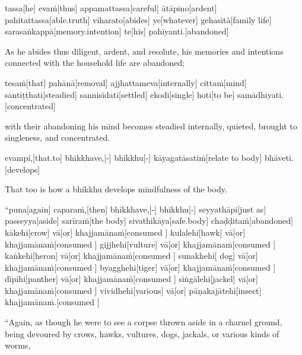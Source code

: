 \begin{samepage}
\begingl[glneveryline={\PaliGlossA,\PaliGlossB}]
tassa[he] evaṁ[thus] appamattassa[careful] ātāpino[ardent] pahitattassa[able.truth] viharato[abides] ye[whatever] gehasitā[family life] sarasaṅkappā[memory.intention] te[his] pahīyanti.[abandoned]
\endgl
\nopagebreak
\linespread{0.5}
\begin{spacin}{0.2}
{\PaliGlossFT As he abides thus diligent, ardent, and resolute, his memories and intentions connected with the household life are abandoned;}
\end{spacin}
\vskip 12pt
\end{samepage}
\begin{samepage}
\begingl[glneveryline={\PaliGlossA,\PaliGlossB}]
tesaṁ[that] pahānā[removal] ajjhattameva[internally] cittaṁ[mind] santiṭṭhati[steadied] sannisīdati[settled] ekodi[single] hoti[to be] samādhiyati.[concentrated]
\endgl
\nopagebreak
\linespread{0.5}
\begin{spacin}{0.2}
{\PaliGlossFT with their abandoning his mind becomes steadied internally, quieted, brought to singleness, and concentrated.}
\end{spacin}
\vskip 12pt
\end{samepage}
\begin{samepage}
\begingl[glneveryline={\PaliGlossA,\PaliGlossB}]
evampi,[that.to] bhikkhave,[-] bhikkhu[-] kāyagatāsatiṁ[relate to body] bhāveti.[develops]
\endgl
\nopagebreak
\linespread{0.5}
\begin{spacin}{0.2}
{\PaliGlossFT That too is how a bhikkhu develops mindfulness of the body.}
\end{spacin}
\vskip 12pt
\end{samepage}
\vskip 0.05in
\begin{samepage}
\begingl[glneveryline={\PaliGlossA,\PaliGlossB}]
“puna[again] caparaṁ,[then] bhikkhave,[-] bhikkhu[-] seyyathāpi[just as] passeyya[aside] sarīraṁ[the body] sivathikāya[safe.body] chaḍḍitaṁ[abandoned] kākehi[crow] vā[or] khajjamānaṁ[consumed ] kulalehi[hawk] vā[or] khajjamānaṁ[consumed ] gijjhehi[vulture] vā[or] khajjamānaṁ[consumed ] kaṅkehi[heron] vā[or] khajjamānaṁ[consumed ] sunakhehi[ dog] vā[or] khajjamānaṁ[consumed ] byagghehi[tiger] vā[or] khajjamānaṁ[consumed ] dīpīhi[panther] vā[or] khajjamānaṁ[consumed ] siṅgālehi[jackel] vā[or] khajjamānaṁ[consumed ] vividhehi[various] vā[or] pāṇakajātehi[insect] khajjamānaṁ.[consumed ]
\endgl
\nopagebreak
\linespread{0.5}
\begin{spacin}{0.2}
{\PaliGlossFT “Again, as though he were to see a corpse thrown aside in a charnel ground, being devoured by crows, hawks, vultures, dogs, jackals, or various kinds of worms,}
\end{spacin}
\vskip 12pt
\end{samepage}
